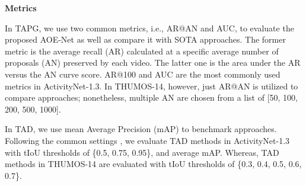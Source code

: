 \documentclass[sn-mathphys]{sn-jnl}
\theoremstyle{thmstyleone}\newtheorem{theorem}{Theorem}\newtheorem{proposition}[theorem]{Proposition}
\theoremstyle{thmstyletwo}\newtheorem{example}{Example}\newtheorem{remark}{Remark}
\theoremstyle{thmstylethree}\newtheorem{definition}{Definition}
\begin{document}
\vspace{2mm}
\noindent\textbf{Metrics}

\noindent In TAPG, we use two common metrics, i.e., AR@AN and AUC, to evaluate the proposed AOE-Net as well as compare it with SOTA approaches. The former metric is the average recall (AR) calculated at a specific average number of proposals (AN) preserved by each video. The latter one is the area under the AR versus the AN curve score. AR@100 and AUC are the most commonly used metrics in ActivityNet-1.3. In THUMOS-14, however, just AR@AN is utilized to compare approaches; nonetheless, multiple AN are chosen from a list of [50, 100, 200, 500, 1000].

In TAD, we use mean Average Precision (mAP) to benchmark approaches. Following the common settings \cite{lin2018bsn, dbg, bmn, tsi_accv, MR_eccv2020}, we evaluate TAD methods in ActivityNet-1.3 with tIoU thresholds of \{0.5, 0.75, 0.95\}, and average mAP. Whereas, TAD methods in THUMOS-14 are evaluated with tIoU thresholds of \{0.3, 0.4, 0.5, 0.6, 0.7\}.
\end{document}
